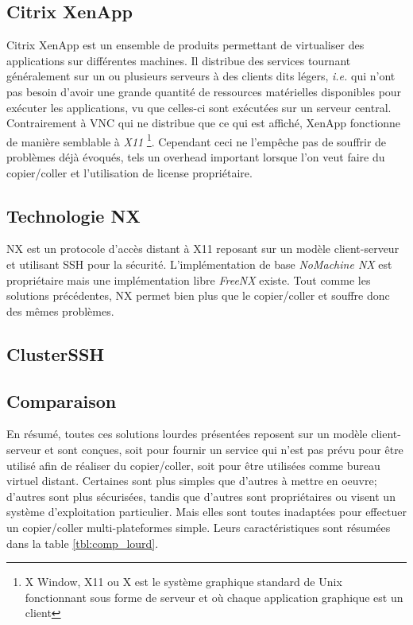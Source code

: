 \subsection{Citrix XenApp}
Citrix XenApp \cite{wiki:xenapp} est un ensemble de produits permettant de
virtualiser des applications sur différentes machines. Il distribue
des services tournant généralement sur un ou plusieurs serveurs à des
clients dits légers, \emph{i.e.} qui n'ont pas besoin d'avoir une grande
quantité de ressources matérielles disponibles pour exécuter
les applications, vu que celles-ci sont exécutées sur un serveur central.
Contrairement à VNC qui ne distribue que ce qui est
affiché, XenApp fonctionne de manière semblable à \emph{X11}
\footnote{X Window, X11 ou X est le système
graphique standard de Unix fonctionnant sous forme de serveur et où
chaque application graphique est un client}. Cependant ceci ne l'empêche
pas de souffrir de problèmes déjà évoqués, tels un overhead important lorsque
l'on veut faire du copier/coller et l'utilisation de license propriétaire.

\subsection{Technologie NX}
NX \cite{wiki:nx} est un protocole d'accès distant à X11 reposant sur un
modèle client-serveur et utilisant SSH pour la sécurité. L'implémentation
de base \emph{NoMachine NX} est propriétaire mais une implémentation libre
\emph{FreeNX} \cite{freenx} existe. Tout comme les solutions précédentes, NX
permet bien plus que le copier/coller et souffre donc des mêmes problèmes.

\subsection{ClusterSSH}

\subsection{Comparaison}
En résumé, toutes ces solutions lourdes présentées reposent
sur un modèle client-serveur et sont conçues, soit pour fournir un service
qui n'est pas prévu pour être utilisé afin de réaliser du copier/coller,
soit pour être utilisées comme bureau virtuel distant. Certaines sont
plus simples que d'autres à mettre en oeuvre; d'autres sont plus sécurisées,
tandis que d'autres sont propriétaires ou visent un système d'exploitation
particulier. Mais elles sont toutes inadaptées pour effectuer
un copier/coller multi-plateformes simple. Leurs caractéristiques sont résumées
dans la table \ref{tbl:comp_lourd}.

